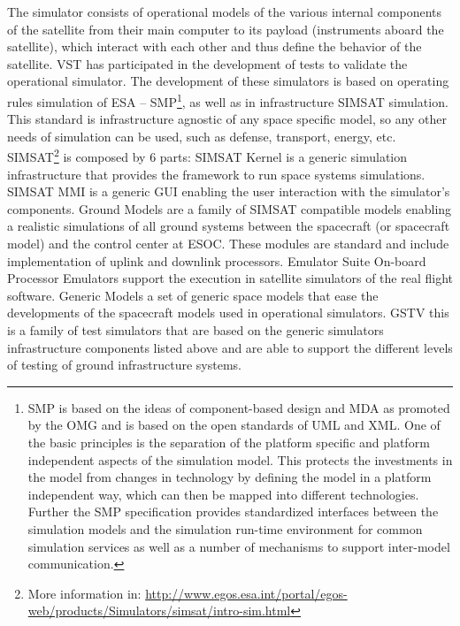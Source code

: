 The simulator consists of operational models of the various internal components of the satellite from their main computer to its payload (instruments aboard the satellite),
which interact with each other and thus define the behavior of the satellite.
\ac{VST} has participated in the development of tests to validate the operational simulator.
The development of these simulators is based on operating rules simulation of
\ac{ESA} -- \ac{SMP}\footnote{\ac{SMP} is based on the ideas of component-based design and \ac{MDA}
as promoted by the \ac{OMG} and is based on the open standards of \ac{UML} and \ac{XML}.
One of the basic principles is the separation of the platform specific and platform independent aspects of the simulation model.
This protects the investments in the model from changes in technology by defining the model in a platform independent way, which can then be mapped into different technologies.
Further the \ac{SMP} specification provides standardized interfaces between the simulation models and the simulation run-time environment for common simulation services as well as a
number of mechanisms to support inter-model communication.\cite{1A,2A,3A,4A,5A}}, as well as in infrastructure \ac{SIMSAT} simulation.
This standard is infrastructure agnostic of any space specific model, so any other needs of simulation can be used, such as defense, transport, energy, etc.\\
\ac{SIMSAT}\footnote{More information in: \url{http://www.egos.esa.int/portal/egos-web/products/Simulators/simsat/intro-sim.html}} is composed by $6$ parts:
\ac{SIMSAT} Kernel is a generic simulation infrastructure that provides the framework to run space systems simulations.
\ac{SIMSAT} \ac{MMI} is a generic \ac{GUI} enabling the user interaction with the simulator's components.
Ground Models are a family of \ac{SIMSAT} compatible models enabling a realistic simulations of all ground systems between the spacecraft (or spacecraft model)
and the control center at \ac{ESOC}\cite{Martin_whitepaper}. These modules are standard and include implementation of uplink and downlink processors.
Emulator Suite On-board Processor Emulators support the execution in satellite simulators of the real flight software.
Generic Models a set of generic space models that ease the developments of the spacecraft models used in operational simulators.
\ac{GSTV} this is a family of test simulators that are based on the generic simulators infrastructure components listed above and are able to support the different levels
of testing of ground infrastructure systems.\\

